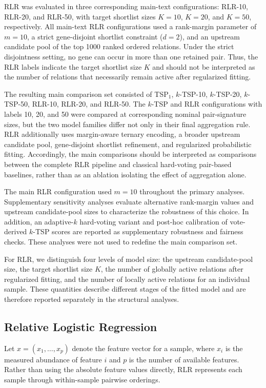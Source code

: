 \documentclass[journal]{IEEEtran}
\begin{document}
RLR was evaluated in three corresponding main-text configurations: RLR-10, RLR-20, and RLR-50, with target shortlist sizes $K=10$, $K=20$, and $K=50$, respectively. All main-text RLR configurations used a rank-margin parameter of $m=10$, a strict gene-disjoint shortlist constraint ($d=2$), and an upstream candidate pool of the top 1000 ranked ordered relations. Under the strict disjointness setting, no gene can occur in more than one retained pair. Thus, the RLR labels indicate the target shortlist size $K$ and should not be interpreted as the number of relations that necessarily remain active after regularized fitting.

The resulting main comparison set consisted of TSP$_1$, $k$-TSP-10, $k$-TSP-20, $k$-TSP-50, RLR-10, RLR-20, and RLR-50. The $k$-TSP and RLR configurations with labels 10, 20, and 50 were compared at corresponding nominal pair-signature sizes, but the two model families differ not only in their final aggregation rule. RLR additionally uses margin-aware ternary encoding, a broader upstream candidate pool, gene-disjoint shortlist refinement, and regularized probabilistic fitting. Accordingly, the main comparisons should be interpreted as comparisons between the complete RLR pipeline and classical hard-voting pair-based baselines, rather than as an ablation isolating the effect of aggregation alone.

The main RLR configuration used $m=10$ throughout the primary analyses. Supplementary sensitivity analyses evaluate alternative rank-margin values and upstream candidate-pool sizes to characterize the robustness of this choice. In addition, an adaptive-$k$ hard-voting variant and post-hoc calibration of vote-derived $k$-TSP scores are reported as supplementary robustness and fairness checks. These analyses were not used to redefine the main comparison set.

For RLR, we distinguish four levels of model size: the upstream candidate-pool size, the target shortlist size $K$, the number of globally active relations after regularized fitting, and the number of locally active relations for an individual sample. These quantities describe different stages of the fitted model and are therefore reported separately in the structural analyses.

\subsection{Relative Logistic Regression}

Let $x=(x_1,\dots,x_p)$ denote the feature vector for a sample, where $x_i$ is the measured abundance of feature $i$ and $p$ is the number of available features. Rather than using the absolute feature values directly, RLR represents each sample through within-sample pairwise orderings.
\end{document}
